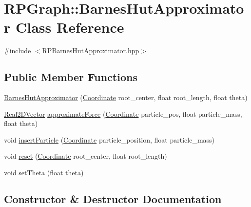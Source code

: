 \hypertarget{classRPGraph_1_1BarnesHutApproximator}{}\section{R\+P\+Graph\+:\+:Barnes\+Hut\+Approximator Class Reference}
\label{classRPGraph_1_1BarnesHutApproximator}


{\ttfamily \#include $<$R\+P\+Barnes\+Hut\+Approximator.\+hpp$>$}

\subsection*{Public Member Functions}
\begin{DoxyCompactItemize}
\item 
\mbox{\hyperlink{classRPGraph_1_1BarnesHutApproximator_a3089b1161c56d66862aae604554b7bd5}{Barnes\+Hut\+Approximator}} (\mbox{\hyperlink{classRPGraph_1_1Coordinate}{Coordinate}} root\+\_\+center, float root\+\_\+length, float theta)
\item 
\mbox{\hyperlink{classRPGraph_1_1Real2DVector}{Real2\+D\+Vector}} \mbox{\hyperlink{classRPGraph_1_1BarnesHutApproximator_a28582390211be5a653420a6ff6e2c392}{approximate\+Force}} (\mbox{\hyperlink{classRPGraph_1_1Coordinate}{Coordinate}} particle\+\_\+pos, float particle\+\_\+mass, float theta)
\item 
void \mbox{\hyperlink{classRPGraph_1_1BarnesHutApproximator_a11275640594b1e706c2ca9cd58cf4b67}{insert\+Particle}} (\mbox{\hyperlink{classRPGraph_1_1Coordinate}{Coordinate}} particle\+\_\+position, float particle\+\_\+mass)
\item 
void \mbox{\hyperlink{classRPGraph_1_1BarnesHutApproximator_ae05dc350ca9e9cc89eb2263f39c9e0bd}{reset}} (\mbox{\hyperlink{classRPGraph_1_1Coordinate}{Coordinate}} root\+\_\+center, float root\+\_\+length)
\item 
void \mbox{\hyperlink{classRPGraph_1_1BarnesHutApproximator_a49d72989a8357ba4be81945c919b70ea}{set\+Theta}} (float theta)
\end{DoxyCompactItemize}


\subsection{Constructor \& Destructor Documentation}
\mbox{\label{classRPGraph_1_1BarnesHutApproximator_a3089b1161c56d66862aae604554b7bd5}} 
